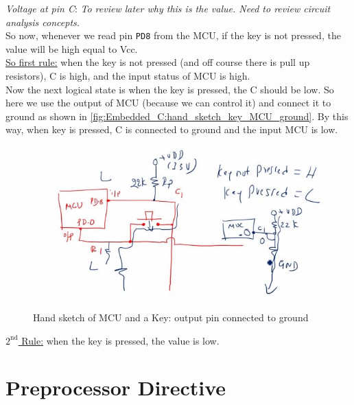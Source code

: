  \textit{Voltage at pin C}: \textit{To review later why this is the value. Need to review circuit analysis concepts.}\\

So now, whenever we read pin \verb|PD8| from the MCU, if the key is not pressed, the value will be high equal to Vcc.\\

\underline{So first rule:} when the key is not pressed (and off course there is pull up resistors), C is high, and the input status of MCU is high.\\

Now the next logical state is when the key is pressed, the C should be low. So here we use the output of MCU (because we can control it) and connect it to ground as shown in \autoref{fig:Embedded_C:hand_sketch_key_MCU_ground}. By this way, when key is pressed, C is connected to ground and the input MCU is low.\\

\begin{figure}[h]
\centering
\includegraphics[scale=0.55]{Figures/Embedded_C/hand_sketch_key_MCU_ground}
\caption{Hand sketch of MCU and a Key: output pin connected to ground}
\label{fig:Embedded_C:hand_sketch_key_MCU_ground}
\end{figure}


\underline{$\mathrm{2}^\mathrm{nd}$ Rule:} when the key is pressed, the value is low.



\newpage

\section{Preprocessor Directive}
\label{Sec:Preprocessor_Directive}

